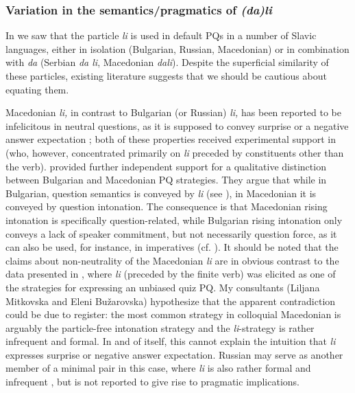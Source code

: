 \documentclass[output=paper,colorlinks,citecolor=brown]{langscibook}
\begin{document}
\subsubsection{Variation in the semantics/pragmatics of \textit{(da)li}}\label{sim:sec:variation-li}

In  we saw that the particle \textit{li} is used in default PQs in a number of Slavic languages, either in isolation (Bulgarian, Russian, Macedonian) or in combination with \textit{da} (Serbian \textit{da li}, Macedonian \textit{dali}). Despite the superficial similarity of these particles, existing literature suggests that we should be cautious about equating them.

Macedonian \textit{li,} in contrast to Bulgarian (or Russian) \textit{li,} has been reported to be infelicitous in neutral questions, as it is supposed to convey surprise \citep{Rudin.etal1999,Lazarova-Nikovska2003} or a negative answer expectation \citep{Englund1977}; both of these properties received experimental support in \citet{Jordanoska.Meertens2021} (who, however, concentrated primarily on \textit{li} preceded by constituents other than the verb). \citet{Rudin.Rudin2022} provided further independent support for a qualitative distinction between Bulgarian and Macedonian PQ strategies. They argue that while in Bulgarian, question semantics is conveyed by \textit{li} (see ), in Macedonian it is conveyed by question intonation. The consequence is that Macedonian rising intonation is specifically question-related, while Bulgarian rising intonation only conveys a lack of speaker commitment, but not necessarily question force, as it can also be used, for instance, in imperatives (cf. \citealt{Rudin2022}). It should be noted that the claims about non-neutrality of the Macedonian \textit{li} are in obvious contrast to the data presented in , where \textit{li} (preceded by the finite verb) was elicited as one of the strategies for expressing an unbiased quiz PQ. My consultants (Liljana Mitkovska and Eleni Bužarovska) hypothesize that the apparent contradiction could be due to register: the most common strategy in colloquial Macedonian is arguably the particle-free intonation strategy \citep{Englund1977,Rudin.Rudin2022} and the \textit{li}-strategy is rather infrequent and formal. In and of itself, this cannot explain the intuition that \textit{li} expresses surprise or negative answer expectation. Russian may serve as another member of a minimal pair in this case, where \textit{li} is also rather formal and infrequent \citep{Onoeva.Stankova2025}, but is not reported to give rise to pragmatic implications.
\end{document}
